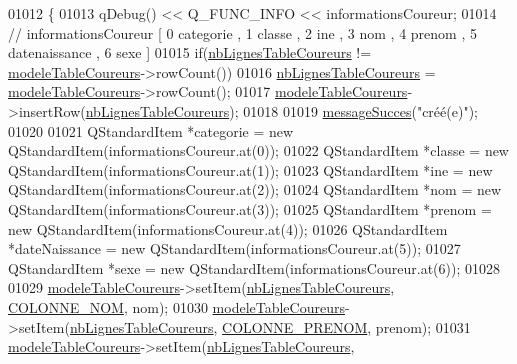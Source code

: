 \begin{DoxyCode}
01012 \{
01013     qDebug() << Q\_FUNC\_INFO << informationsCoureur;
01014     \textcolor{comment}{// informationsCoureur [ 0 categorie , 1 classe , 2 ine , 3 nom , 4 prenom , 5 datenaissance , 6 sexe ]}
01015     \textcolor{keywordflow}{if}(\hyperlink{class_i_h_m_gestion_cross_a0f4f5886077b1c5cbfa9cc0680d0380f}{nbLignesTableCoureurs} != \hyperlink{class_i_h_m_gestion_cross_ad9560c4804694dbbf969de5f6f56eb30}{modeleTableCoureurs}->rowCount())
01016         \hyperlink{class_i_h_m_gestion_cross_a0f4f5886077b1c5cbfa9cc0680d0380f}{nbLignesTableCoureurs} = \hyperlink{class_i_h_m_gestion_cross_ad9560c4804694dbbf969de5f6f56eb30}{modeleTableCoureurs}->rowCount();
01017     \hyperlink{class_i_h_m_gestion_cross_ad9560c4804694dbbf969de5f6f56eb30}{modeleTableCoureurs}->insertRow(\hyperlink{class_i_h_m_gestion_cross_a0f4f5886077b1c5cbfa9cc0680d0380f}{nbLignesTableCoureurs});
01018 
01019     \hyperlink{class_i_h_m_gestion_cross_a71412d0c3e1d059a646c755803077a7b}{messageSucces}(\textcolor{stringliteral}{"créé(e)"});
01020 
01021     QStandardItem *categorie = \textcolor{keyword}{new} QStandardItem(informationsCoureur.at(0));
01022     QStandardItem *classe  = \textcolor{keyword}{new} QStandardItem(informationsCoureur.at(1));
01023     QStandardItem *ine  = \textcolor{keyword}{new} QStandardItem(informationsCoureur.at(2));
01024     QStandardItem *nom  = \textcolor{keyword}{new} QStandardItem(informationsCoureur.at(3));
01025     QStandardItem *prenom  = \textcolor{keyword}{new} QStandardItem(informationsCoureur.at(4));
01026     QStandardItem *dateNaissance  = \textcolor{keyword}{new} QStandardItem(informationsCoureur.at(5));
01027     QStandardItem *sexe  = \textcolor{keyword}{new} QStandardItem(informationsCoureur.at(6));
01028 
01029     \hyperlink{class_i_h_m_gestion_cross_ad9560c4804694dbbf969de5f6f56eb30}{modeleTableCoureurs}->setItem(\hyperlink{class_i_h_m_gestion_cross_a0f4f5886077b1c5cbfa9cc0680d0380f}{nbLignesTableCoureurs}, 
      \hyperlink{ihmchronocross_8h_aeee76385895c145ef5a633e6c6812603}{COLONNE\_NOM}, nom);
01030     \hyperlink{class_i_h_m_gestion_cross_ad9560c4804694dbbf969de5f6f56eb30}{modeleTableCoureurs}->setItem(\hyperlink{class_i_h_m_gestion_cross_a0f4f5886077b1c5cbfa9cc0680d0380f}{nbLignesTableCoureurs}, 
      \hyperlink{ihmchronocross_8h_a5d6f240d26209cd66db8aa5e1aac62f9}{COLONNE\_PRENOM}, prenom);
01031     \hyperlink{class_i_h_m_gestion_cross_ad9560c4804694dbbf969de5f6f56eb30}{modeleTableCoureurs}->setItem(\hyperlink{class_i_h_m_gestion_cross_a0f4f5886077b1c5cbfa9cc0680d0380f}{nbLignesTableCoureurs}, 

\end{DoxyCode}
